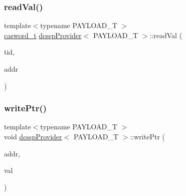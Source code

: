 \mbox{\label{classdcsspProvider_acb3482d51f7d439984ef18d3aa4819cd}} 
\subsubsection{\texorpdfstring{read\+Val()}{readVal()}}
{\footnotesize\ttfamily template$<$typename P\+A\+Y\+L\+O\+A\+D\+\_\+T $>$ \\
\hyperlink{rq__unsafe_8h_ad45142aaf2ff20a036dc6242b8483e9c}{casword\+\_\+t} \hyperlink{classdcsspProvider}{dcssp\+Provider}$<$ P\+A\+Y\+L\+O\+A\+D\+\_\+T $>$\+::read\+Val (\begin{DoxyParamCaption}\item[{const int}]{tid,  }\item[{\hyperlink{rq__unsafe_8h_ad45142aaf2ff20a036dc6242b8483e9c}{casword\+\_\+t} volatile $\ast$}]{addr }\end{DoxyParamCaption})}

\mbox{\label{classdcsspProvider_ae915e5f5824576fc6cde8cf81bea4980}} 
\subsubsection{\texorpdfstring{write\+Ptr()}{writePtr()}}
{\footnotesize\ttfamily template$<$typename P\+A\+Y\+L\+O\+A\+D\+\_\+T $>$ \\
void \hyperlink{classdcsspProvider}{dcssp\+Provider}$<$ P\+A\+Y\+L\+O\+A\+D\+\_\+T $>$\+::write\+Ptr (\begin{DoxyParamCaption}\item[{\hyperlink{rq__unsafe_8h_ad45142aaf2ff20a036dc6242b8483e9c}{casword\+\_\+t} volatile $\ast$}]{addr,  }\item[{\hyperlink{rq__unsafe_8h_ad45142aaf2ff20a036dc6242b8483e9c}{casword\+\_\+t}}]{val }\end{DoxyParamCaption})}

\mbox{\label{classdcsspProvider_a7f2905e08fe20ca166fabc0c81ed28e4}} 
